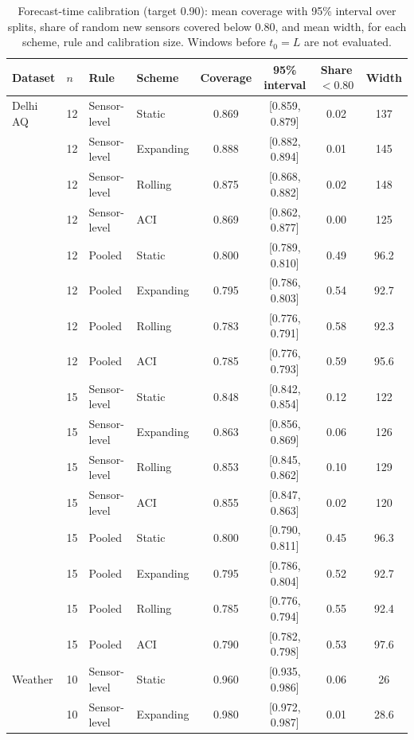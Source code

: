 \begin{table}[htbp]
\caption{Forecast-time calibration (target 0.90): mean coverage with 95\% interval over splits, share of random new sensors covered below 0.80, and mean width, for each scheme, rule and calibration size. Windows before $t_0=L$ are not evaluated.}
\label{tab:deployfull}
\centering\scriptsize
\begin{tabular}{llllcccc}
\toprule
\textbf{Dataset} & $n$ & \textbf{Rule} & \textbf{Scheme} & \textbf{Coverage} & \textbf{95\% interval} & \textbf{Share $<0.80$} & \textbf{Width} \\
\midrule
Delhi AQ & 12 & Sensor-level & Static & 0.869 & [0.859, 0.879] & 0.02 & 137 \\
 & 12 & Sensor-level & Expanding & 0.888 & [0.882, 0.894] & 0.01 & 145 \\
 & 12 & Sensor-level & Rolling & 0.875 & [0.868, 0.882] & 0.02 & 148 \\
 & 12 & Sensor-level & ACI & 0.869 & [0.862, 0.877] & 0.00 & 125 \\
 & 12 & Pooled & Static & 0.800 & [0.789, 0.810] & 0.49 & 96.2 \\
 & 12 & Pooled & Expanding & 0.795 & [0.786, 0.803] & 0.54 & 92.7 \\
 & 12 & Pooled & Rolling & 0.783 & [0.776, 0.791] & 0.58 & 92.3 \\
 & 12 & Pooled & ACI & 0.785 & [0.776, 0.793] & 0.59 & 95.6 \\
 & 15 & Sensor-level & Static & 0.848 & [0.842, 0.854] & 0.12 & 122 \\
 & 15 & Sensor-level & Expanding & 0.863 & [0.856, 0.869] & 0.06 & 126 \\
 & 15 & Sensor-level & Rolling & 0.853 & [0.845, 0.862] & 0.10 & 129 \\
 & 15 & Sensor-level & ACI & 0.855 & [0.847, 0.863] & 0.02 & 120 \\
 & 15 & Pooled & Static & 0.800 & [0.790, 0.811] & 0.45 & 96.3 \\
 & 15 & Pooled & Expanding & 0.795 & [0.786, 0.804] & 0.52 & 92.7 \\
 & 15 & Pooled & Rolling & 0.785 & [0.776, 0.794] & 0.55 & 92.4 \\
 & 15 & Pooled & ACI & 0.790 & [0.782, 0.798] & 0.53 & 97.6 \\
\midrule
Weather & 10 & Sensor-level & Static & 0.960 & [0.935, 0.986] & 0.06 & 26 \\
 & 10 & Sensor-level & Expanding & 0.980 & [0.972, 0.987] & 0.01 & 28.6 \\

\end{tabular}
\end{table}
